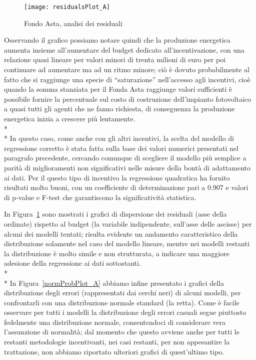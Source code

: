 \documentclass[12pt,a4paper,openright,twoside]{report}
\begin{document}
\begin{figure}[hbt]
	\centering
	\texttt{[image: residualsPlot\_A]}
	\caption{Fondo Asta, analisi dei residuali}
	\label{residualsPlot_A}
\end{figure}

Osservando il grafico possiamo notare quindi che la produzione energetica aumenta insieme all'aumentare del budget dedicato all'incentivazione, con una relazione quasi lineare per valori minori di trenta milioni di euro per poi continuare ad aumentare ma ad un ritmo minore; ciò è dovuto probabilmente al fatto che si raggiunge una specie di ``saturazione'' nell'accesso agli incentivi, cioè quando la somma stanziata per il Fonda Asta raggiunge valori sufficienti è possibile fornire la percentuale sul costo di costruzione dell'impianto fotovoltaico a quasi tutti gli agenti che ne fanno richiesta, di conseguenza la produzione energetica inizia a crescere più lentamente.\\* \\*
In questo caso, come anche con gli altri incentivi, la scelta del modello di regressione corretto è stata fatta sulla base dei valori numerici presentati nel paragrafo precedente, cercando comunque di scegliere il modello più semplice a parità di miglioramenti non significativi nelle misure della bontà di adattamento ai dati. Per il questo tipo di incentivo la regressione quadratica ha fornito risultati molto buoni, con un coefficiente di determinazione pari a 0.907 e valori di p-value e F-test che garantiscono la significatività statistica.

In Figura~\ref{residualsPlot_A} sono mostrati i grafici di dispersione dei residuali (asse della ordinate) rispetto al budget (la variabile indipendente, sull'asse delle ascisse) per alcuni dei modelli tentati; risulta evidente un andamento caratteristico della distribuzione solamente nel caso del modello lineare, mentre nei modelli restanti la distribuzione è molto simile e non strutturata, a indicare una maggiore adesione della regressione ai dati sottostanti.\\* \\*
In Figura~\ref{normProbPlot_A} abbiamo infine presentato i grafici della distribuzione degli errori (rappresentati dai cerchi neri) di alcuni modelli, per confrontarli con una distribuzione normale standard (la retta). Come è facile osservare per tutti i modelli la distribuzione degli errori casuali segue piuttosto fedelmente una distribuzione normale, consentendoci di considerare vera l'assunzione di normalità; dal momento che questo avviene anche per tutti le restanti metodologie incentivanti, nei casi restanti, per non appesantire la trattazione, non abbiamo riportato ulteriori grafici di quest'ultimo tipo. 
\end{document}
